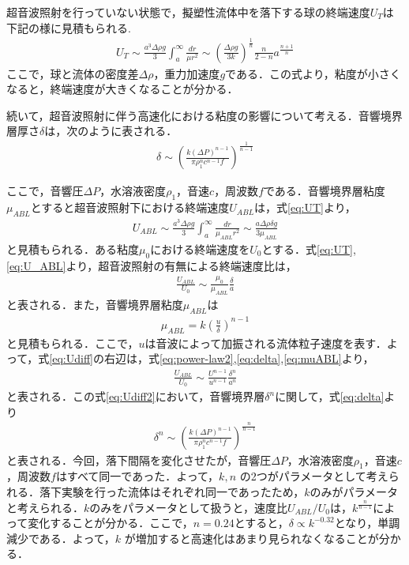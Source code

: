超音波照射を行っていない状態で，擬塑性流体中を落下する球の終端速度$U_T$は下記の様に見積もられる\cite{ref:8}.
\begin{eqnarray}
    U_T \sim \frac{a^3\Delta\rho g}{3}  \int^{\infty}_{a} \frac{dr}{\mu r^2} \sim \left(\frac{\Delta \rho g}{3k}\right)^{\frac{1}{n}}\frac{n}{2-n}a^{\frac{n+1}{n}}
    \label{eq:UT}
\end{eqnarray}
ここで，球と流体の密度差$\Delta \rho$，重力加速度$g$である．この式より，粘度が小さくなると，終端速度が大きくなることが分かる．

続いて，超音波照射に伴う高速化における粘度の影響について考える．音響境界層厚さ$\delta$は，次のように表される．
\begin{eqnarray}
    \delta \sim \left(\frac{k\left(\Delta P\right)^{n-1}}{\pi \rho^n_1 c^{n-1} f}\right)^{\frac{1}{n-1}}
    \label{eq:delta}
\end{eqnarray}

ここで，音響圧$\Delta P$，水溶液密度$\rho_1$，音速$c$，周波数$f$である．音響境界層粘度$\mu_{ABL}$とすると超音波照射下における終端速度$U_{ABL}$は，式\ref{eq:UT}より，
\begin{eqnarray}
    U_{ABL} \sim \frac{a^3\Delta\rho g}{3}  \int^{\infty}_{a} \frac{dr}{\mu_{ABL} r^2} \sim \frac{a\Delta \rho \delta g}{3\mu_{ABL}}
    \label{eq:U_ABL}
\end{eqnarray}
と見積もられる．ある粘度$\mu_0$における終端速度を$U_0$とする．式\ref{eq:UT},\ref{eq:U_ABL}より，超音波照射の有無による終端速度比は，
\begin{eqnarray}
    \frac{U_{ABL}}{U_0} \sim \frac{\mu_0}{\mu_{ABL}}\frac{\delta}{a}
    \label{eq:Udiff}
\end{eqnarray}
と表される．また，音響境界層粘度$\mu_{ABL}$は
\begin{eqnarray}
    \mu_{ABL}=k\left(\frac{u}{\delta}\right)^{n-1}
    \label{eq:muABL}
\end{eqnarray}
と見積もられる．ここで，$u$は音波によって加振される流体粒子速度を表す．よって，式\ref{eq:Udiff}の右辺は，式\ref{eq:power-law2},\ref{eq:delta},\ref{eq:muABL}より，
\begin{eqnarray}
    \frac{U_{ABL}}{U_0} \sim \frac{U^{n-1}}{u^{n-1}}\frac{\delta^n}{a^n}
    \label{eq:Udiff2}
\end{eqnarray}
と表される．この式\ref{eq:Udiff2}において，音響境界層$\delta^n$に関して，式\ref{eq:delta}より
\begin{eqnarray}
    \delta^n \sim \left(\frac{k\left(\Delta P\right)^{n-1}}{\pi \rho^n_1 c^{n-1} f}\right)^{\frac{n}{n-1}}
    \label{eq:ndelta}
\end{eqnarray}
と表される．今回，落下間隔を変化させたが，音響圧$\Delta P$，水溶液密度$\rho_1$，音速$c$，周波数$f$はすべて同一であった．よって，$k,n$ の2つがパラメータとして考えられる．落下実験を行った流体はそれぞれ同一であったため，$k$のみがパラメータと考えられる．$k$のみをパラメータとして扱うと，速度比$U_{ABL}/U_0$は，$k^\frac{n}{n-1}$によって変化することが分かる．ここで，$n=0.24$とすると，$\delta \propto k^{-0.32}$となり，単調減少である．よって，$k$ が増加すると高速化はあまり見られなくなることが分かる．

